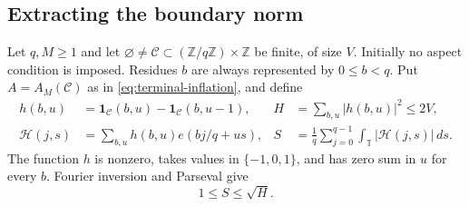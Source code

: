 \documentclass[11pt,reqno]{amsart}
\numberwithin{equation}{section}
\theoremstyle{definition}
\theoremstyle{remark}
\newcommand{\Z}{\mathbb Z}
\newcommand{\T}{\mathbb T}
\newcommand{\one}{\mathbf 1}
\begin{document}
\subsection{Extracting the boundary norm}

Let $q,M\ge1$ and let
$\varnothing\ne\mathcal C\subset(\Z/q\Z)\times\Z$ be finite, of size
$V$. Initially no aspect condition is imposed. Residues $b$ are always
represented by $0\le b<q$. Put $A=A_M(\mathcal C)$ as in
\eqref{eq:terminal-inflation}, and define
\begin{align}
 h(b,u)&=\one_{\mathcal C}(b,u)-\one_{\mathcal C}(b,u-1),
 &H&=\sum_{b,u}|h(b,u)|^2\le2V,\label{eq:boundary-def}\\
 \mathscr H(j,s)&=\sum_{b,u}h(b,u)e(bj/q+us),
 &S&=\frac1q\sum_{j=0}^{q-1}\int_\T|\mathscr H(j,s)|\,ds.
 \label{eq:boundary-norm}
\end{align}
The function $h$ is nonzero, takes values in $\{-1,0,1\}$, and has zero
sum in $u$ for every $b$. Fourier inversion and Parseval give
\begin{equation}\label{eq:S-bounds}
 1\le S\le\sqrt H.
\end{equation}
\end{document}
